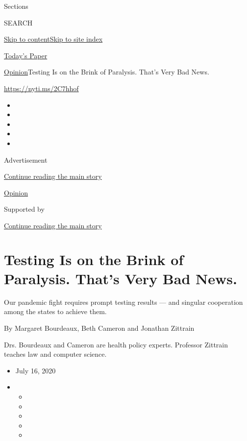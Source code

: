 Sections

SEARCH

\protect\hyperlink{site-content}{Skip to
content}\protect\hyperlink{site-index}{Skip to site index}

\href{https://myaccount.nytimes.com/auth/login?response_type=cookie\&client_id=vi}{}

\href{https://www.nytimes.com/section/todayspaper}{Today's Paper}

\href{/section/opinion}{Opinion}\textbar{}Testing Is on the Brink of
Paralysis. That's Very Bad News.

\href{https://nyti.ms/2C7hhof}{https://nyti.ms/2C7hhof}

\begin{itemize}
\item
\item
\item
\item
\item
\end{itemize}

Advertisement

\protect\hyperlink{after-top}{Continue reading the main story}

\href{/section/opinion}{Opinion}

Supported by

\protect\hyperlink{after-sponsor}{Continue reading the main story}

\hypertarget{testing-is-on-the-brink-of-paralysis-thats-very-bad-news}{%
\section{Testing Is on the Brink of Paralysis. That's Very Bad
News.}\label{testing-is-on-the-brink-of-paralysis-thats-very-bad-news}}

Our pandemic fight requires prompt testing results --- and singular
cooperation among the states to achieve them.

By Margaret Bourdeaux, Beth Cameron and Jonathan Zittrain

Drs. Bourdeaux and Cameron are health policy experts. Professor Zittrain
teaches law and computer science.

\begin{itemize}
\item
  July 16, 2020
\item
  \begin{itemize}
  \item
  \item
  \item
  \item
  \item
  \end{itemize}
\end{itemize}

